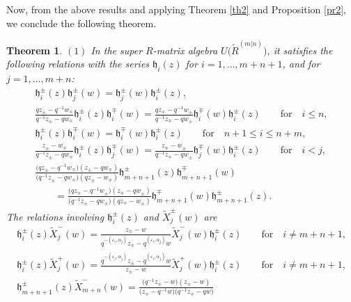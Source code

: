 \documentclass[pdftex]{sigma}
\numberwithin{equation}{section}
\newtheorem{Theorem}{Theorem}[section]
\begin{document}
Now, from the above results and applying Theorem \ref{th2} and Proposition \ref{pr2}, we conclude the following theorem.
\begin{Theorem}\label{th3}
$(1)$ In the super $R$-matrix algebra $U\bigl(\widetilde{R}^{(m|n)}\bigr)$, it satisfies the following relations with the series $\mathfrak{h}_i(z)$ for $i=1,\dots,m+n+1$, and  for $j=1,\dots,m+n$:
\begin{gather*}%
 \mathfrak{h}_i^{\pm}(z)\mathfrak{h}_j^{\pm}(w)=\mathfrak{h}_j^{\pm}(w)\mathfrak{h}_i^{\pm}(z), \\
 \frac{qz_{\pm}-q^{-1}w_{\mp}}{q^{-1}z_{\pm}-qw_{\mp}}\mathfrak{h}_i^{\pm}(z)\mathfrak{h}_i^{\mp}(w)
 =\frac{qz_{\mp}-q^{-1}w_{\pm}}{q^{-1}z_{\mp}-qw_{\pm}}\mathfrak{h}_i^{\mp}(w)\mathfrak{h}_i^{\pm}(z)\qquad
 \text{for} \quad i\leq n,\\
 \mathfrak{h}_i^{\pm}(z)\mathfrak{h}_i^{\mp}(w)=\mathfrak{h}_i^{\mp}(w)\mathfrak{h}_i^{\pm}(z)\qquad
 \text{for} \quad n+1\leq i\leq n+m,\\
 \frac{z_{\pm}-w_{\mp}}{q^{-1}z_{\pm}-qw_{\mp}}\mathfrak{h}_i^{\pm}(z)\mathfrak{h}_j^{\mp}(w)=\frac{z_{\mp}-w_{\pm}}{q^{-1}z_{\mp}-qw_{\pm}} \mathfrak{h}_j^{\mp}(w)\mathfrak{h}_i^{\pm}(z) \qquad
 \text{for} \quad i<j,
\\
 \frac{\bigl(qz_{\pm}-q^{-1}w_{\mp}\bigr)(z_{\pm}-qw_{\mp})}{\bigl(q^{-1}z_{\pm}-qw_{\mp}\bigr)
 (qz_{\pm}-w_{\mp})} \mathfrak{h}_{m+n+1}^{\pm}(z)\mathfrak{h}_{m+n+1}^{\mp}(w)\\
 \qquad =\frac{\bigl(qz_{\mp}-q^{-1}w_{\pm}\bigr)(z_{\mp}-qw_{\pm})}{\bigl(q^{-1}z_{\pm}-qw_{\pm}\bigr)
 (qz_{\mp}-w_{\pm})}\mathfrak{h}_{m+n+1}^{\mp}(w)\mathfrak{h}_{m+n+1}^{\pm}(z).
\end{gather*}
The relations involving $\mathfrak{h}_i^{\pm}(z)$ and $\widetilde{X}_j^{\pm}(w)$ are
\begin{gather*}%
 \mathfrak{h}_i^{\pm}(z)\widetilde{X}_j^-(w)=\frac{z_{\mp}-w}{q^{-(\varepsilon_i,\alpha_j)}z_{\mp}-q^{(\varepsilon_i, \alpha_j)}w}\widetilde{X}_j^-(w)\mathfrak{h}_i^{\pm}(z)\qquad
 \text{for} \quad i\neq m+n+1,\\
 \mathfrak{h}_i^{\pm}(z)\widetilde{X}_j^+(w)=\frac{q^{-(\varepsilon_i,\alpha_j)}z_{\pm}-q^{(\varepsilon_i,\alpha_j)}w}{z_{\pm}-w}\widetilde{X}_j^+(w) \mathfrak{h}_i^{\pm}(z)\qquad
 \text{for} \quad i\neq m+n+1,\\
 \mathfrak{h}_{m+n+1}^{\pm}(z)\widetilde{X}_{m+n}^-(w)=\frac{\bigl(q^{-1}z_{\mp}-w\bigr)(z_{\mp}-w)}{\bigl(z_{\mp}-q^{-1}w\bigr)\bigl(q^{-1}z_{\mp}-qw\bigr)}

\end{gather*}
\end{Theorem}
\end{document}

